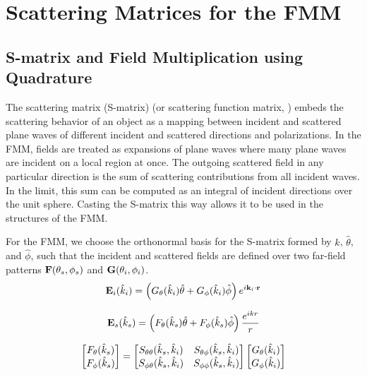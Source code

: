 \clearpage
\newpage

\section{Scattering Matrices for the FMM}

\subsection{S-matrix and Field Multiplication using Quadrature}

The scattering matrix (S-matrix) (or scattering function matrix, \cite{tsang2000scattering}) embeds the scattering behavior of an object as a mapping between incident and scattered plane waves of different incident and scattered directions and polarizations. In the FMM, fields are treated as expansions of plane waves where many plane waves are incident on a local region at once. The outgoing scattered field in any particular direction is the sum of scattering contributions from all incident waves. In the limit, this sum can be computed as an integral of incident directions over the unit sphere. Casting the  S-matrix this way allows it to be used in the structures of the FMM.  

For the FMM, we choose the orthonormal basis for the S-matrix formed by $\hat{k}$, $\hat{\theta}$, and $\hat{\phi}$, such that the incident and scattered fields are defined over two far-field patterns $\mathbf{F}(\theta_s,\phi_s)$ and $\mathbf{G}(\theta_i,\phi_i)$. \begin{equation}
\mathbf{E}_i(\hat{k}_i) = \left(G_{\theta}(\hat{k}_i)\hat{\theta}  +G_{\phi}(\hat{k}_i) \hat{\phi} \right) e^{i\mathbf{k}_i \cdot \mathbf{r}}
\end{equation}

\begin{equation}
\mathbf{E}_s(\hat{k}_s) = \left( F_{\theta}(\hat{k}_s)\hat{\theta} +  F_{\phi}(\hat{k}_s)\hat{\phi}\right) \dfrac{ e^{i k r}}{r}
\end{equation}
 
\begin{equation}
\begin{bmatrix} F_{\theta}(\hat{k}_s) \\ F_{\phi}(\hat{k}_s) \end{bmatrix} = 
\begin{bmatrix} S_{\theta\theta}(\hat{k}_s,\hat{k}_i)  & S_{\theta\phi}(\hat{k}_s,\hat{k}_i)  \\ S_{\phi\theta}(\hat{k}_s,\hat{k}_i)  & S_{\phi\phi}(\hat{k}_s,\hat{k}_i)  \end{bmatrix}   
\begin{bmatrix} G_{\theta}(\hat{k}_i) \\ G_{\phi}(\hat{k}_i) \end{bmatrix} 
\end{equation}

 

